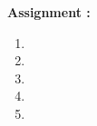 \documentclass[a4 paper, 12pt]{report}
\begin{document}
\begin{center}
    \large \textbf{Assignment  : }
\end{center}
    

\begin{enumerate}
    
    \item 
    
    \item 
    
    \item 
    
    \item 
    
    \item 
    
\end{enumerate}
\end{document}
